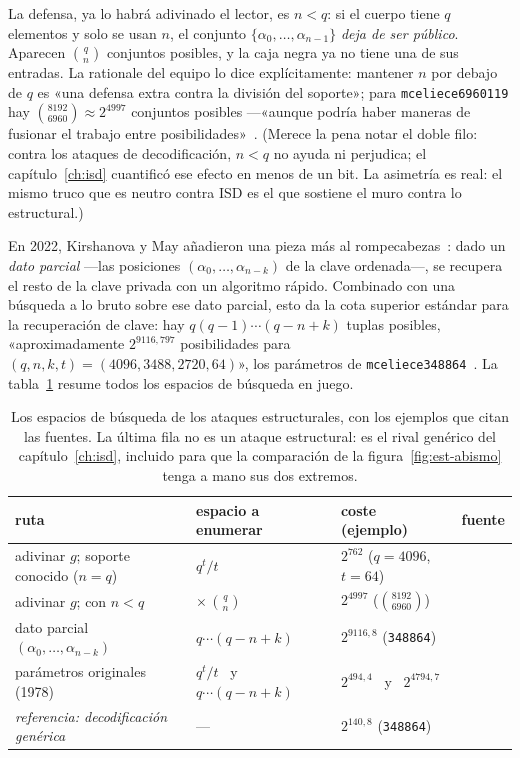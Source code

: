La defensa, ya lo habrá adivinado el lector, es $n<q$: si el cuerpo
tiene $q$ elementos y solo se usan $n$, el conjunto
$\{\alpha_0,\dots,\alpha_{n-1}\}$ \emph{deja de ser público}.
Aparecen $\binom{q}{n}$ conjuntos posibles, y la caja negra ya no
tiene una de sus entradas. La rationale del equipo lo dice
explícitamente: mantener $n$ por debajo de $q$ es «una defensa extra
contra la división del soporte»; para \texttt{mceliece6960119} hay
$\binom{8192}{6960}\approx 2^{4997}$ conjuntos posibles ---«aunque
podría haber maneras de fusionar el trabajo entre
posibilidades»~\cite{cmrationale}. (Merece la pena notar el doble
filo: contra los ataques de decodificación, $n<q$ no ayuda ni
perjudica; el capítulo~\ref{ch:isd} cuantificó ese efecto en menos
de un bit. La asimetría es real: el mismo truco que es neutro contra
ISD es el que sostiene el muro contra lo estructural.)

En 2022, Kirshanova y May añadieron una pieza más al
rompecabezas~\cite{kirshanova2022}: dado un \emph{dato parcial} ---las
posiciones $(\alpha_0,\dots,\alpha_{n-k})$ de la clave ordenada---,
se recupera el resto de la clave privada con un algoritmo rápido.
Combinado con una búsqueda a lo bruto sobre ese dato parcial, esto
da la cota superior estándar para la recuperación de clave: hay
$q(q-1)\cdots(q-n+k)$ tuplas posibles, «aproximadamente
$2^{9116{,}797}$ posibilidades para
$(q,n,k,t)=(4096,3488,2720,64)$», los parámetros de
\texttt{mceliece348864}~\cite{cmsecurity}. La tabla~\ref{tab:est-espacios}
resume todos los espacios de búsqueda en juego.

\begin{table}[htbp]
\centering
\footnotesize
\setlength{\tabcolsep}{5pt}
\begin{tabular}{llll}
\toprule
ruta & espacio a enumerar & coste (ejemplo) & fuente\\
\midrule
adivinar $g$; soporte conocido ($n=q$) & $q^{t}/t$ &
  $2^{762}$ ($q=4096$, $t=64$) & \cite{cmsecurity}\\
adivinar $g$; con $n<q$ & $\times\,\binom{q}{n}$ &
  $2^{4997}$ ($\binom{8192}{6960}$) & \cite{cmrationale}\\
dato parcial $(\alpha_0,\dots,\alpha_{n-k})$ & $q\cdots(q-n+k)$ &
  $2^{9116{,}8}$ (\texttt{348864}) & \cite{cmsecurity,kirshanova2022}\\
parámetros originales (1978) & $q^{t}/t$ \ y \ $q\cdots(q-n+k)$ &
  $2^{494{,}4}$ \ y \ $2^{4794{,}7}$ & \cite{cmrationale}\\
\midrule
\emph{referencia: decodificación genérica} & --- &
  $2^{140{,}8}$ (\texttt{348864}) & \cite{cmsecurity}\\
\bottomrule
\end{tabular}
\caption{Los espacios de búsqueda de los ataques estructurales, con
los ejemplos que citan las fuentes. La última fila no es un ataque
estructural: es el rival genérico del capítulo~\ref{ch:isd}, incluido
para que la comparación de la figura~\ref{fig:est-abismo} tenga a
mano sus dos extremos.}
\label{tab:est-espacios}
\end{table}

